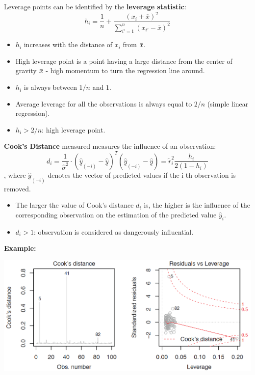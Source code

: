 \documentclass[11pt]{article}
\newcommand*\samplemean[1]{\overline{#1}}
\newcommand{\overbar}[1]{\mkern 1.5mu\overline{\mkern-1.5mu#1\mkern-1.5mu}\mkern 1.5mu}
\begin{document}
\noindent
Leverage points can be identified by the \textbf{leverage statistic}:
\begin{equation*}
	h_i = \frac{1}{n} + \frac{(x_i + \samplemean{x})^2}{\sum_{i' = 1}^{n}(x_{i'}-\samplemean{x})^2}
\end{equation*}

\begin{itemize}[noitemsep]
	\item $h_i$ increases with the distance of $x_i$ from $\overbar{x}$.
	\item High leverage point is a point having a large distance from the center of gravity $\overbar{x}$ - high momentum to turn the regression line around.
	\item $h_i$ is always between $1/n$ and $1$.
	\item Average leverage for all the observations is always equal to $2/n$ (simple linear regression).
	\item $h_i > 2/n$: high leverage point.
\end{itemize}

\noindent
\textbf{Cook's Distance} measured measures the influence of an observation:
\begin{equation*}
	d_i = \frac{1}{\hat{\sigma}^2}\cdot\left(\underline{\hat{y}}_{(-i)} - \underline{\hat{y}}\right)^T \left(\underline{\hat{y}}_{(-i)} - \underline{\hat{y}}\right) = \widetilde{r}_i^2 \frac{h_i}{2(1-h_i)}
\end{equation*}
, where $\underline{\hat{y}}_{(-i)}$ denotes the vector of predicted values if the i th observation is removed.

\begin{itemize}[noitemsep]
	\item The larger the value of Cook’s distance $d_i$ is, the higher is the influence of the corresponding observation on the estimation of the predicted value $\hat{y}_i$.
	\item $d_i > 1$: observation is considered as dangerously influential.
\end{itemize}
 
\noindent
\textbf{Example:}
\begin{center}
	\includegraphics[width=0.6\linewidth]{img/cooks-distance}
\end{center}
\end{document}

